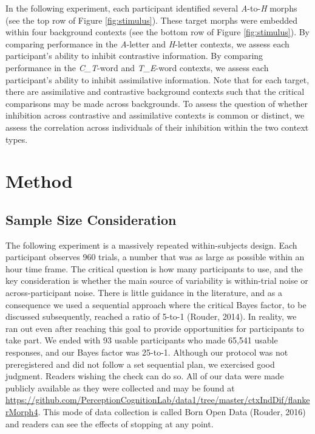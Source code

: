 \documentclass[english,floatsintext,man]{apa6}
\theoremstyle{definition}
\theoremstyle{definition}
\theoremstyle{remark}
\begin{document}
In the following experiment, each participant identified several
\emph{A}-to-\emph{H} morphs (see the top row of Figure
\ref{fig:stimulus}). These target morphs were embedded within four
background contexts (see the bottom row of Figure \ref{fig:stimulus}).
By comparing performance in the \emph{A}-letter and \emph{H}-letter
contexts, we assess each participant's ability to inhibit contrastive
information. By comparing performance in the \emph{C\_T}-word and
\emph{T\_E}-word contexts, we assess each participant's ability to
inhibit assimilative information. Note that for each target, there are
assimilative and contrastive background contexts such that the critical
comparisons may be made across backgrounds. To assess the question of
whether inhibition across contrastive and assimilative contexts is
common or distinct, we assess the correlation across individuals of
their inhibition within the two context types.

\section{Method}\label{method}

\subsection{Sample Size Consideration}\label{sample-size-consideration}

The following experiment is a massively repeated within-subjects design.
Each participant observes 960 trials, a number that was as large as
possible within an hour time frame. The critical question is how many
participants to use, and the key consideration is whether the main
source of variability is within-trial noise or across-participant noise.
There is little guidance in the literature, and as a consequence we used
a sequential approach where the critical Bayes factor, to be discussed
subsequently, reached a ratio of 5-to-1 (Rouder, 2014). In reality, we
ran out even after reaching this goal to provide opportunities for
participants to take part. We ended with 93 usable participants who made
65,541 usable responses, and our Bayes factor was 25-to-1. Although our
protocol was not preregistered and did not follow a set sequential plan,
we exercised good judgment. Readers wishing the check can do so. All of
our data were made publicly available as they were collected and may be
found at
\url{https://github.com/PerceptionCognitionLab/data1/tree/master/ctxIndDif/flankerMorph4}.
This mode of data collection is called Born Open Data (Rouder, 2016) and
readers can see the effects of stopping at any point.
\end{document}
